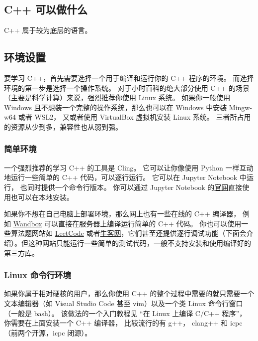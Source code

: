 

\begin{issues}
\issueDraft
\end{issues}

\subsection{C++ 可以做什么}
C++ 属于较为底层的语言。

\subsection{环境设置}

要学习 C++，首先需要选择一个用于编译和运行你的 C++ 程序的环境。 而选择环境的第一步是选择一个操作系统。 对于小时百科的绝大部分使用 C++ 的场景（主要是科学计算）来说，强烈推荐你使用 Linux 系统。 如果你一般使用 Windows 且不想装一个完整的操作系统，那么也可以在 Windows 中安装 Mingw-w64 或者 WSL2， 又或者使用 VirtualBox 虚拟机安装 Linux 系统。 三者所占用的资源从少到多，兼容性也从弱到强。

\subsubsection{简单环境}
一个强烈推荐的学习 C++ 的工具是 Cling。 它可以让你像使用 Python 一样互动地运行一些简单的 C++ 代码，可以逐行运行。 它可以在 Jupyter Notebook 中运行， 也同时提供一个命令行版本。 你可以通过 Jupyter Notebook 的\href{https://jupyter.org/}{官网}直接使用也可以在本地安装。

如果你不想在自己电脑上部署环境，那么网上也有一些在线的 C++ 编译器， 例如 \href{https://wandbox.org/}{Wandbox} 可以直接在服务器上编译运行简单的 C++ 代码。 你也可以使用一些算法题网站如 \href{https://leetcode.com/}{LeetCode} 或者\href{https://www.nowcoder.com/}{牛客网}，它们甚至还提供逐行调试功能（下面会介绍）。但这种网站只能运行一些简单的测试代码，一般不支持安装和使用编译好的第三方库。

\subsubsection{Linux 命令行环境}
如果你属于相对硬核的用户，那么你使用 C++ 的整个过程中需要的就只需要一个文本编辑器（如 Visual Studio Code 甚至 vim）以及一个类 Linux 命令行窗口（一般是 bash）。 该做法的一个入门教程见 “在 Linux 上编译 C/C++ 程序”， 你需要在上面安装一个 C++ 编译器， 比较流行的有 g++， clang++ 和 icpc（前两个开源，icpc 闭源）。

